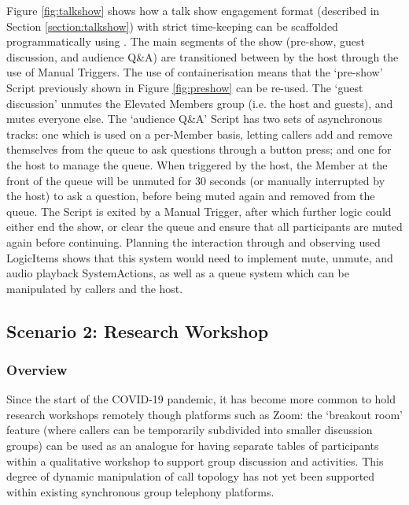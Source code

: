 Figure \ref{fig:talkshow} shows how a talk show engagement format (described in Section \ref{section:talkshow}) with strict time-keeping can be scaffolded programmatically using \ONT{}. The main segments of the show (pre-show, guest discussion, and audience Q\&A) are transitioned between by the host through the use of Manual Triggers. The use of containerisation means that the `pre-show' Script previously shown in Figure \ref{fig:preshow} can be re-used. The `guest discussion' unmutes the Elevated Members group (i.e. the host and guests), and mutes everyone else. The `audience Q\&A' Script has two sets of asynchronous tracks: one which is used on a per-Member basis, letting callers add and remove themselves from the queue to ask questions through a button press; and one for the host to manage the queue. When triggered by the host, the Member at the front of the queue will be unmuted for 30 seconds (or manually interrupted by the host) to ask a question, before being muted again and removed from the queue. The Script is exited by a Manual Trigger, after which further logic could either end the show, or clear the queue and ensure that all participants are muted again before continuing. Planning the interaction through \ONT{} and observing used LogicItems shows that this system would need to implement mute, unmute, and audio playback SystemActions, as well as a queue system which can be manipulated by callers and the host.


\subsection{Scenario 2: Research Workshop}

\subsubsection{Overview}

Since the start of the COVID-19 pandemic, it has become more common to hold research workshops remotely though platforms such as Zoom: the `breakout room' feature (where callers can be temporarily subdivided into smaller discussion groups) can be used as an analogue for having separate tables of participants within a qualitative workshop to support group discussion and activities. This degree of dynamic manipulation of call topology has not yet been supported within existing synchronous group telephony platforms.

